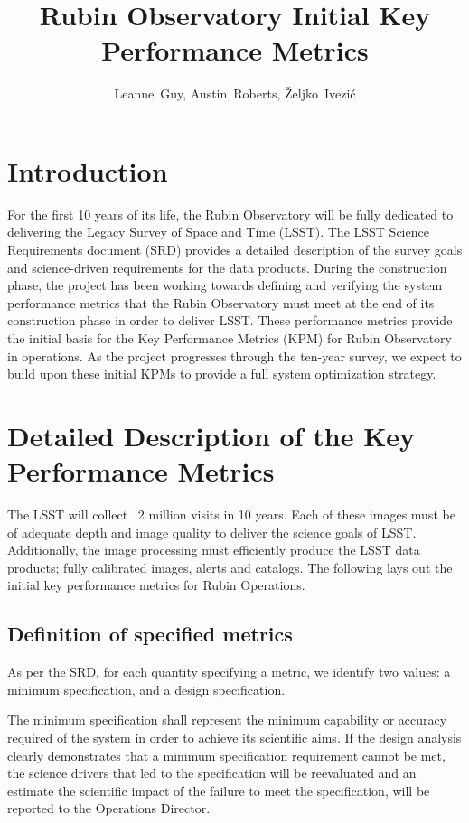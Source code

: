 \documentclass[DM,authoryear,toc]{lsstdoc}
\title{Rubin Observatory Initial Key Performance Metrics}
\author{%
Leanne~Guy, Austin~Roberts, \v{Z}eljko~Ivezi\'c
}
\date{\vcsDate}
\begin{document}
\maketitle


\section{Introduction}
For the first 10 years of its life, the Rubin Observatory will be fully dedicated to delivering the Legacy Survey of Space and Time (LSST). 
The LSST Science Requirements document (SRD)  provides a detailed description of the survey goals and science-driven requirements for the data products. 
During the construction phase, the project has been working towards defining and verifying the system performance metrics that the Rubin Observatory must meet at the end of its construction phase in order to deliver LSST. 
These performance metrics provide the initial basis for the Key Performance Metrics (KPM) for Rubin Observatory in operations.
As the project progresses through the ten-year survey, we expect to build upon these initial KPMs to provide a full system optimization strategy.  


\section{Detailed Description of the  Key Performance Metrics}
The LSST will collect ~2 million visits in 10 years. 
Each of these images must be of adequate depth and image quality to deliver the science goals of LSST. 
Additionally, the image processing must efficiently produce the LSST data products; fully calibrated images, alerts and catalogs.  The following lays out the initial key performance metrics for Rubin Operations. 


 \subsection{Definition of specified metrics}
 As per the SRD, for each quantity specifying a metric, we identify two values: a minimum specification,
and a design specification.

The minimum specification shall represent the minimum capability or accuracy required of the system in order to achieve its scientific aims. 
If the design analysis clearly demonstrates that a minimum specification requirement cannot be met, the science drivers that led to the specification will be reevaluated and an estimate the scientific impact of the failure to meet the specification, will be reported to the Operations Director.
\end{document}
